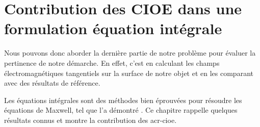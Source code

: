 \chapter{Contribution des CIOE dans une formulation équation intégrale}
\label{sec:equation_integrale}
\minitoc
\newpage
{}
Nous pouvons donc aborder la dernière partie de notre problème pour évaluer la pertinence de notre démarche. En effet, c'est en calculant les champs électromagnétiques tangentiels sur la surface de notre objet et en les comparant avec des résultats de référence.

Les équations intégrales sont des méthodes bien éprouvées pour résoudre les équations de Maxwell, tel que l'a démontré \cite{nedelec_acoustic_2001}. Ce chapitre rappelle quelques résultats connus et montre la contribution des \gls{acr-cioe}.




